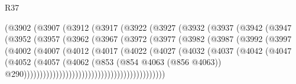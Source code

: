 \begin{lexlean}{R37}
\begin{coremodule}
                        (@3902
                          (@3907
                            (@3912
                              (@3917
                                (@3922
                                  (@3927
                                    (@3932
                                      (@3937
                                        (@3942
                                          (@3947
                                            (@3952
                                              (@3957
                                                (@3962
                                                  (@3967
                                                    (@3972
                                                      (@3977
                                                        (@3982
                                                          (@3987
                                                            (@3992
                                                              (@3997
                                                                (@4002
                                                                  (@4007
                                                                    (@4012
                                                                      (@4017
                                                                        (@4022
                                                                          (@4027
                                                                            (@4032
                                                                              (@4037
                                                                                (@4042
                                                                                  (@4047
                                                                                    (@4052
                                                                                      (@4057
                                                                                        (@4062
                                                                                          (@853
                                                                                            (@854
                                                                                              @4063
                                                                                              (@856
                                                                                                @4063))
                                                                                            @290))))))))))))))))))))))))))))))))))))))))))))

\end{coremodule}
\end{lexlean}
